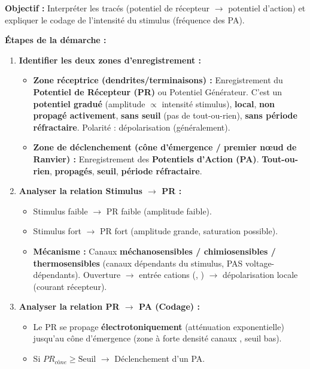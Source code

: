 \documentclass[11pt]{article}
\begin{document}
\begin{methode}
\textbf{Objectif :} Interpréter les tracés (potentiel de récepteur $\rightarrow$ potentiel d'action) et expliquer le codage de l'intensité du stimulus (fréquence des PA).

\textbf{Étapes de la démarche :}
\begin{enumerate}
    \item \textbf{Identifier les deux zones d'enregistrement :}
    \begin{itemize}
        \item \textbf{Zone réceptrice (dendrites/terminaisons) :} Enregistrement du \textbf{Potentiel de Récepteur (PR)} ou Potentiel Générateur. C'est un \textbf{potentiel gradué} (amplitude $\propto$ intensité stimulus), \textbf{local}, \textbf{non propagé activement}, \textbf{sans seuil} (pas de tout-ou-rien), \textbf{sans période réfractaire}. Polarité : dépolarisation (généralement).
        \item \textbf{Zone de déclenchement (cône d'émergence / premier nœud de Ranvier) :} Enregistrement des \textbf{Potentiels d'Action (PA)}. \textbf{Tout-ou-rien}, \textbf{propagés}, \textbf{seuil}, \textbf{période réfractaire}.
    \end{itemize}
    \item \textbf{Analyser la relation Stimulus $\rightarrow$ PR :}
    \begin{itemize}
        \item Stimulus faible $\rightarrow$ PR faible (amplitude faible).
        \item Stimulus fort $\rightarrow$ PR fort (amplitude grande, saturation possible).
        \item \textbf{Mécanisme :} Canaux \textbf{méchanosensibles / chimiosensibles / thermosensibles} (canaux dépendants du stimulus, PAS voltage-dépendants). Ouverture $\rightarrow$ entrée cations (, ) $\rightarrow$ dépolarisation locale (courant récepteur).
    \end{itemize}
    \item \textbf{Analyser la relation PR $\rightarrow$ PA (Codage) :}
    \begin{itemize}
        \item Le PR se propage \textbf{électrotoniquement} (atténuation exponentielle) jusqu'au cône d'émergence (zone à forte densité canaux , seuil bas).
        \item Si $PR_{cône} \ge \text{Seuil}$ $\rightarrow$ Déclenchement d'un PA.

\end{itemize}
\end{enumerate}
\end{methode}
\end{document}
